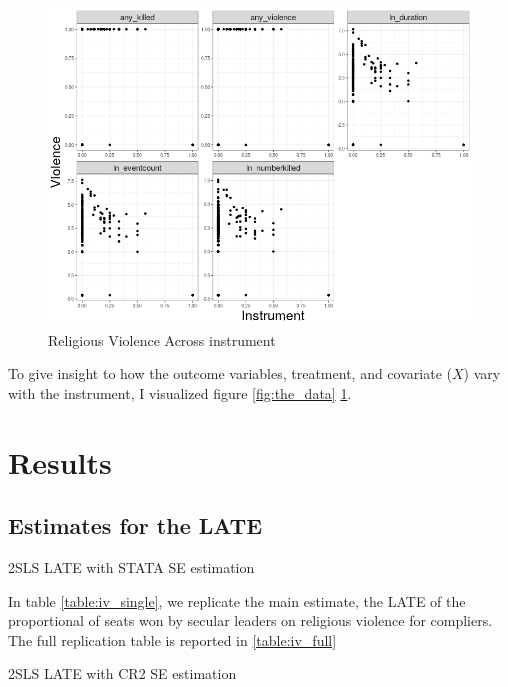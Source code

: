 \documentclass{scrartcl}
\begin{document}
\begin{figure}
    \centering
    \includegraphics[width=0.8\linewidth]{replication/output/Y_on_Z.png}
    \caption{Religious Violence Across instrument}
    \label{fig:Y_on_Z}
\end{figure}

To give insight to how the outcome variables, treatment, and covariate ($X$) vary with the instrument, I visualized figure \ref{fig:the_data} \ref{fig:Y_on_Z}.

\section{Results}
\subsection{Estimates for the LATE} \label{late_results}

\begin{table}[ht]
  \begin{center}
    \scalebox{0.75}{
      
    }
    \caption{2SLS LATE with STATA SE estimation}
    \label{table:iv_single}
  \end{center}
\end{table}

In table \ref{table:iv_single}, we replicate the main estimate, the LATE of the proportional of seats won by secular leaders on religious violence for compliers. The full replication table is reported in \ref{table:iv_full}

\begin{table}[h!]
  \begin{center}
    \scalebox{0.75}{
      
    }
    \caption{2SLS LATE with CR2 SE estimation}
    \label{table:iv_cr2_single}
  \end{center}
\end{table}
\end{document}
